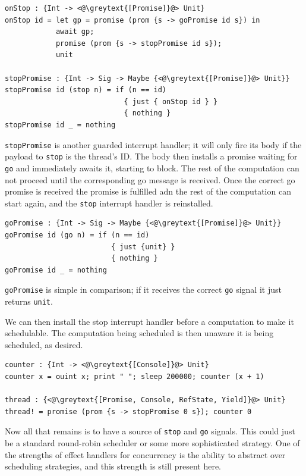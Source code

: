 \documentclass[msc,deptreport,cs]{infthesis} %
\newcommand{\code}[1]{\lstinline{#1}}
\newcommand{\greytext}[1]{\textcolor{black!40}{#1}}
\begin{document}
\begin{lstlisting}
onStop : {Int -> <@\greytext{[Promise]}@> Unit}
onStop id = let gp = promise (prom {s -> goPromise id s}) in
            await gp;
            promise (prom {s -> stopPromise id s});
            unit

stopPromise : {Int -> Sig -> Maybe {<@\greytext{[Promise]}@> Unit}}
stopPromise id (stop n) = if (n == id)
                            { just { onStop id } }
                            { nothing }
stopPromise id _ = nothing
\end{lstlisting}

\code{stopPromise} is another guarded interrupt handler; it will only fire its
body if the payload to \code{stop} is the thread's ID. The body then installs a
promise waiting for \code{go} and immediately awaits it, starting to block. The
rest of the computation can not proceed until the corresponding go message is
received. Once the correct go promise is received the promise is fulfilled adn
the rest of the computation can start again, and the \code{stop} interrupt
handler is reinstalled.

\begin{lstlisting}
goPromise : {Int -> Sig -> Maybe {<@\greytext{[Promise]}@> Unit}}
goPromise id (go n) = if (n == id)
                         { just {unit} }
                         { nothing }
goPromise id _ = nothing
\end{lstlisting}

\code{goPromise} is simple in comparison; if it receives the correct \code{go} signal
it just returns \code{unit}.


We can then install the stop interrupt handler before a computation to make it
schedulable. The computation being scheduled is then unaware it is being
scheduled, as desired.

\begin{lstlisting}
counter : {Int -> <@\greytext{[Console]}@> Unit}
counter x = ouint x; print " "; sleep 200000; counter (x + 1)

thread : {<@\greytext{[Promise, Console, RefState, Yield]}@> Unit}
thread! = promise (prom {s -> stopPromise 0 s}); counter 0
\end{lstlisting}

Now all that remains is to have a source of \code{stop} and \code{go} signals.
This could just be a standard round-robin scheduler or some more sophisticated
strategy. One of the strengths of effect handlers for concurrency is the ability
to abstract over scheduling strategies, and this strength is still present here.
\end{document}
